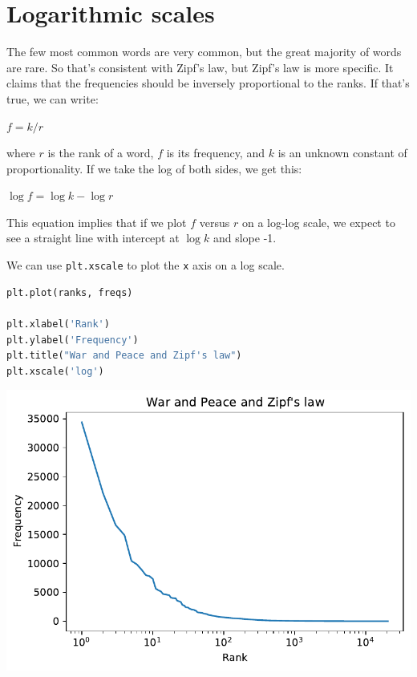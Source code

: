 \hypertarget{logarithmic-scales}{%
\section{Logarithmic scales}\label{logarithmic-scales}}

The few most common words are very common, but the great majority of
words are rare. So that's consistent with Zipf's law, but Zipf's law is
more specific. It claims that the frequencies should be inversely
proportional to the ranks. If that's true, we can write:

\(f = k / r\)

where \(r\) is the rank of a word, \(f\) is its frequency, and \(k\) is
an unknown constant of proportionality. If we take the log of both
sides, we get this:

\(\log f = \log k - \log r\)

This equation implies that if we plot \(f\) versus \(r\) on a log-log
scale, we expect to see a straight line with intercept at \(\log k\) and
slope -1.

We can use \passthrough{\lstinline!plt.xscale!} to plot the
\passthrough{\lstinline!x!} axis on a log scale.

\begin{lstlisting}[language=Python]
plt.plot(ranks, freqs)

plt.xlabel('Rank')
plt.ylabel('Frequency')
plt.title("War and Peace and Zipf's law")
plt.xscale('log')
\end{lstlisting}

\begin{center}
\includegraphics[scale=0.75]{chapters/06_plotting_files/06_plotting_77_0.pdf}
\end{center}


